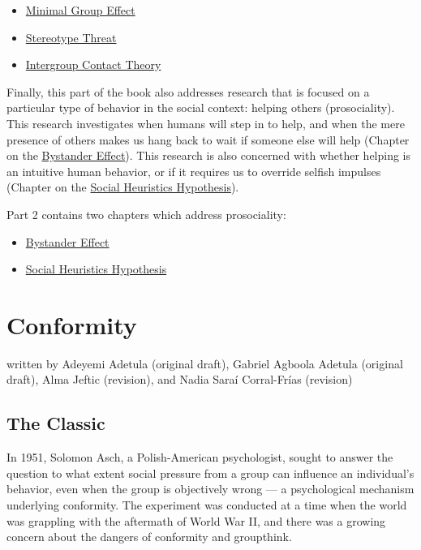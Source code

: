 \documentclass[
  letterpaper,
]{book}
\providecommand{\tightlist}{%
  \setlength{\itemsep}{0pt}\setlength{\parskip}{0pt}}\usepackage{longtable,booktabs,array}
\begin{document}
\begin{itemize}
\tightlist
\item
  \href{chapter9.qmd}{Minimal Group Effect}
\item
  \href{chapter11.qmd}{Stereotype Threat}
\item
  \href{chapter12.qmd}{Intergroup Contact Theory}
\end{itemize}

Finally, this part of the book also addresses research that is focused
on a particular type of behavior in the social context: helping others
(prosociality). This research investigates when humans will step in to
help, and when the mere presence of others makes us hang back to wait if
someone else will help (Chapter on the \href{chapter13.qmd}{Bystander
Effect}). This research is also concerned with whether helping is an
intuitive human behavior, or if it requires us to override selfish
impulses (Chapter on the \href{chapter14.qmd}{Social Heuristics
Hypothesis}).

Part 2 contains two chapters which address prosociality:

\begin{itemize}
\tightlist
\item
  \href{chapter13.qmd}{Bystander Effect}
\item
  \href{chapter14.qmd}{Social Heuristics Hypothesis}
\end{itemize}


\chapter{\texorpdfstring{{Conformity}}{Conformity}}\label{conformity}

{written by Adeyemi Adetula (original draft), Gabriel Agboola Adetula
(original draft), Alma Jeftic (revision), and Nadia Saraí Corral-Frías
(revision)}

\section{The Classic}\label{the-classic-6}

In 1951, Solomon Asch, a Polish-American psychologist, sought to answer
the question to what extent social pressure from a group can influence
an individual's behavior, even when the group is objectively wrong --- a
psychological mechanism underlying conformity. The experiment was
conducted at a time when the world was grappling with the aftermath of
World War II, and there was a growing concern about the dangers of
conformity and groupthink.
\end{document}

